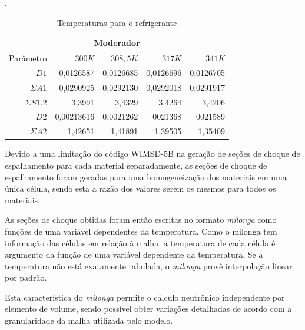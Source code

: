 \begin{table}[htb]
  \centering
  \caption[Temperaturas para o refrigerante.]{Temperaturas para o refrigerante}.
  \label{tab:temp-coolant}
  \begin{tabular}{r r r r r}
    \multicolumn{5}{c}{Moderador} \\
    \hline
    Parâmetro & $300K$ & $308,5K$ & $317K$ & $341K$ \\
    \hline
    $D1$ & 0,0126587 & 0,0126685 & 0,0126696 & 0,0126705\\
    $\Sigma A1$ & 0,0290925 & 0,0292130 & 0,0292018 & 0,0291917\\
    $\Sigma S1.2$ & 3,3991 & 3,4329 & 3,4264 & 3,4206\\
    \hline
    $D2$ & 0,00213616 & 0,0021262 & 0021368 & 0021589\\
    $\Sigma A2$ & 1,42651 & 1,41891 & 1,39505 & 1,35409\\
    \hline
  \end{tabular}
\end{table}


Devido a uma limitação do código WIMSD-5B na geração de seções de choque de espalhamento
para cada material separadamente, as seções de choque de
espalhamento foram geradas para uma homogeneização dos materiais em uma única célula,
sendo esta a razão dos valores serem os mesmos para todos os materiais.

%
%
As seções de choque obtidas foram então escritas no formato \textit{milonga} como
funções de uma variável dependentes da temperatura. Como o milonga tem informação
das células em relação à malha, a temperatura de cada célula é argumento da
função de uma variável dependente da temperatura. Se a temperatura não está
exatamente tabulada, o \textit{milonga} provê interpolação linear por padrão.

Esta característica do \textit{milonga} permite o cálculo neutrônico
independente por elemento de volume, sendo possível obter variações detalhadas
de acordo com a granularidade da malha utilizada pelo modelo.
